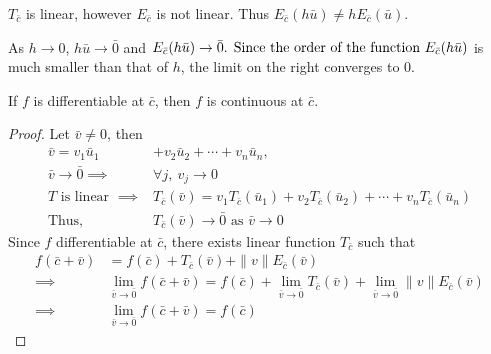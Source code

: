 \begin{note}
$T_{\bar{c}}$ is linear, however $E_{\bar{c}}$ is not linear.
Thus $E_{\bar{c}}(h\bar{u}) \ne h E_{\bar{c}} (\bar{u})$.

As $h \to 0$, $h\bar{u} \to \bar{0}$ and \( E_{\bar{c}}(h\bar{u}) \to \bar{0}$.
Since the order of the function \( E_{\bar{c}}(h\bar{u}) \) is much smaller than that of $h$, the limit on the right converges to 0.
\end{note}

\begin{theorem}
If $f$ is differentiable at \( \bar{c} \), then $f$ is continuous at \( \bar{c} \).
\end{theorem}
\begin{proof}
Let $\bar{v} \ne 0$, then
\begin{align*}
	\bar{v} = v_1 \bar{u}_1 & + v_2 \bar{u}_2 + \dotsb + v_n \bar{u}_n,\\
	\bar{v} \to \bar{0} \implies & \forall j,\ v_j \to 0 \\
	T \text{ is linear }\implies & T_{\bar{c}} (\bar{v}) = v_1 T_{\bar{c}}(\bar{u}_1) + v_2 T_{\bar{c}}(\bar{u}_2) + \dotsb + v_n T_{\bar{c}}(\bar{u}_n)\\
	\text{Thus, } & T_{\bar{c}}(\bar{v}) \to \bar{0} \text{ as } \bar{v} \to 0
\end{align*}
Since $f$ differentiable at \( \bar{c} \), there exists linear function $T_{\bar{c}}$ such that
\begin{align*}
	f(\bar{c}+\bar{v}) & =  f(\bar{c}) + T_{\bar{c}}(\bar{v}) + \|v\|E_{\bar{c}}(\bar{v}) \\
	\implies & \lim_{\bar{v} \to \bar{0}} f(\bar{c}+\bar{v}) = f(\bar{c}) + \lim_{\bar{v} \to \bar{0}} T_{\bar{c}}(\bar{v}) + \lim_{\bar{v} \to \bar{0}} \|v\|E_{\bar{c}}(\bar{v})\\
	\implies & \lim_{\bar{v} \to \bar{0}} f(\bar{c}+\bar{v}) = f(\bar{c})
\end{align*}
\end{proof}

